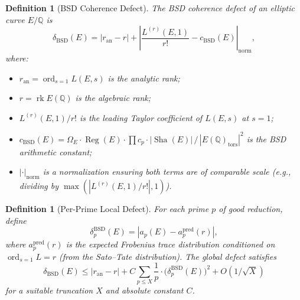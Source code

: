 \documentclass[11pt]{article}
\newtheorem{definition}[theorem]{Definition}
\DeclareMathOperator{\rk}{rk}
\DeclareMathOperator{\ord}{ord}
\DeclareMathOperator{\Reg}{Reg}
\DeclareMathOperator{\Sha}{Sha}
\begin{document}
\begin{definition}[BSD Coherence Defect]
\label{def:delta-BSD}
The \emph{BSD coherence defect} of an elliptic curve $E/\mathbb{Q}$ is
\[
  \delta_{\mathrm{BSD}}(E) =
  |r_{\mathrm{an}} - r| +
  \left| \frac{L^{(r)}(E,1)}{r!} - c_{\mathrm{BSD}}(E) \right|_{\mathrm{norm}},
\]
where:
\begin{itemize}
  \item $r_{\mathrm{an}} = \ord_{s=1} L(E,s)$ is the analytic rank;
  \item $r = \rk E(\mathbb{Q})$ is the algebraic rank;
  \item $L^{(r)}(E,1)/r!$ is the leading Taylor coefficient of $L(E,s)$ at
    $s = 1$;
  \item $c_{\mathrm{BSD}}(E) =
    \Omega_E \cdot \Reg(E) \cdot \prod c_p \cdot |\Sha(E)| \,/\,
    |E(\mathbb{Q})_{\mathrm{tors}}|^2$ is the BSD arithmetic constant;
  \item $|\cdot|_{\mathrm{norm}}$ is a normalization ensuring both terms are of
    comparable scale (e.g., dividing by $\max(|L^{(r)}(E,1)/r!|, 1)$).
\end{itemize}
\end{definition}

\begin{definition}[Per-Prime Local Defect]
\label{def:local-defect}
For each prime $p$ of good reduction, define
\[
  \delta_p^{\mathrm{BSD}}(E) =
  |a_p(E) - a_p^{\mathrm{pred}}(r)|,
\]
where $a_p^{\mathrm{pred}}(r)$ is the expected Frobenius trace distribution
conditioned on $\ord_{s=1} L = r$ (from the Sato--Tate distribution).  The
global defect satisfies
\[
  \delta_{\mathrm{BSD}}(E) \leq
  |r_{\mathrm{an}} - r| +
  C \sum_{p \leq X} \frac{1}{p} \cdot \bigl(\delta_p^{\mathrm{BSD}}(E)\bigr)^2
  + O(1/\sqrt{X})
\]
for a suitable truncation $X$ and absolute constant $C$.
\end{definition}
\end{document}

